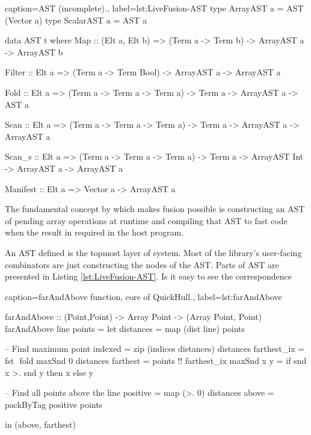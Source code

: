 \documentclass[preamble.tex]{subfiles}
\begin{document}
\begin{hscode2}{%
    caption={\LiveFusion AST (incomplete).},%
    label=lst:LiveFusion-AST}
type ArrayAST a = AST (Vector a)
type ScalarAST a = AST a

data AST t where
  Map      :: (Elt a, Elt b)
           => (Term a -> Term b)
           -> ArrayAST a
           -> ArrayAST b

  Filter   :: Elt a
           => (Term a -> Term Bool)
           -> ArrayAST a
           -> ArrayAST a

  Fold     :: Elt a
           => (Term a -> Term a -> Term a)
           -> Term a
           -> ArrayAST a
           -> AST a

  Scan     :: Elt a
           => (Term a -> Term a -> Term a)
           -> Term a
           -> ArrayAST a
           -> ArrayAST a

  Scan_s   :: Elt a
           => (Term a -> Term a -> Term a)
           -> Term a
           -> ArrayAST Int
           -> ArrayAST a
           -> ArrayAST a

  Manifest :: Elt a
           => Vector a
           -> ArrayAST a
\end{hscode2}

The fundamental concept by which \LiveFusion makes fusion possible is constructing an AST\iast{} of pending array operations at runtime and compiling that AST to fast code when the result in required in the host program.

An AST defined \Haskell is the topmost layer of \LiveFusion system. Most of the library's user-facing combinators are just constructing the nodes of the AST. Parts of \LiveFusion AST are presented in Listing \ref{lst:LiveFusion-AST}. Is it easy to see the correspondence

\begin{hscode2}{%
    caption={farAndAbove function, core of QuickHull.},%
    label=lst:farAndAbove}

farAndAbove :: (Point,Point) -> Array Point -> (Array Point, Point)
farAndAbove line points
  = let distances = map (dist line) points

        -- Find maximum point
        indexed     = zip (indices distances) distances
        farthest_ix = fst $$ fold maxSnd 0 distances
        farthest    = points !! farthest_ix
        maxSnd x y  = if snd x >. snd y
                      then x
                      else y

        -- Find all points above the line
        positive    = map (>. 0) distances
        above       = packByTag positive points

    in  (above, farthest)
\end{hscode2}
\end{document}
